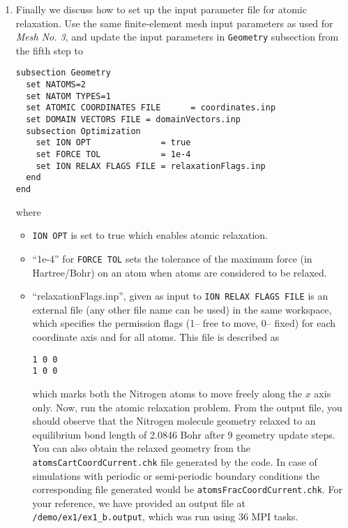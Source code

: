 \begin{enumerate}
\item Finally we discuss how to set up the input parameter file for atomic relaxation. Use the same finite-element mesh input parameters as used for \emph{Mesh No. 3}, and update the 
input parameters in \verb|Geometry| subsection from the fifth step to
\begin{verbatim}
subsection Geometry
  set NATOMS=2
  set NATOM TYPES=1
  set ATOMIC COORDINATES FILE      = coordinates.inp 
  set DOMAIN VECTORS FILE = domainVectors.inp
  subsection Optimization
    set ION OPT              = true
    set FORCE TOL            = 1e-4    
    set ION RELAX FLAGS FILE = relaxationFlags.inp
  end
end
\end{verbatim}
where
\begin{itemize}
\item \verb|ION OPT| is set to true which enables atomic relaxation.  		
\item ``1e-4'' for \verb|FORCE TOL| sets the tolerance of the maximum force (in Hartree/Bohr) on an atom when atoms are
considered to be relaxed.
\item ``relaxationFlags.inp'', given as input to \verb|ION RELAX FLAGS FILE| is an external file (any other file name can be used) in the same workspace, which specifies the permission flags (1-- free to move, 0-- fixed) for each coordinate axis and for all atoms. This file is described as 
\begin{verbatim}
1 0 0
1 0 0
\end{verbatim}
which marks both the Nitrogen atoms to move freely along the $x$ axis only.
Now, run the atomic relaxation problem. From the output file, you should observe that the Nitrogen molecule geometry relaxed to
an equilibrium bond length of 2.0846 Bohr after 9 geometry update steps. You can also obtain the relaxed geometry from the \verb|atomsCartCoordCurrent.chk| file generated by the code. In case of simulations with periodic or semi-periodic boundary conditions the corresponding file generated would be \verb|atomsFracCoordCurrent.chk|. For your reference, we have provided an output file at \verb|/demo/ex1/ex1_b.output|, which was run using 36 MPI tasks.
\end{itemize}
\end{enumerate}


